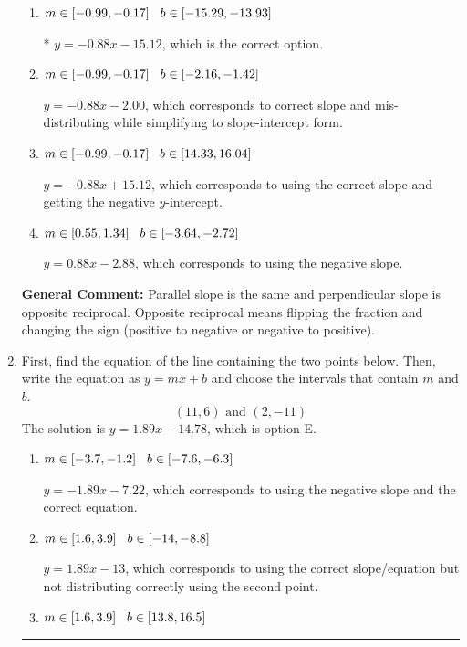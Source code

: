 \documentclass{extbook}[14pt]
\newcommand{\litem}[1]{\item #1

\rule{\textwidth}{0.4pt}}
\begin{document}
\begin{enumerate}
{\begin{enumerate}[label=\Alph*.]
 $y = -1.14x - 15.12$, which corresponds to using the reciprocal slope $(1/m)$.
\item \( m \in [-0.99, -0.17] \hspace*{3mm} b \in [-15.29, -13.93] \)

* $y = -0.88x - 15.12$, which is the correct option.
\item \( m \in [-0.99, -0.17] \hspace*{3mm} b \in [-2.16, -1.42] \)

 $y = -0.88x - 2.00$, which corresponds to correct slope and mis-distributing while simplifying to slope-intercept form.
\item \( m \in [-0.99, -0.17] \hspace*{3mm} b \in [14.33, 16.04] \)

 $y = -0.88x + 15.12$, which corresponds to using the correct slope and getting the negative $y$-intercept.
\item \( m \in [0.55, 1.34] \hspace*{3mm} b \in [-3.64, -2.72] \)

 $y = 0.88x - 2.88$, which corresponds to using the negative slope.
\end{enumerate}

\textbf{General Comment:} Parallel slope is the same and perpendicular slope is opposite reciprocal. Opposite reciprocal means flipping the fraction and changing the sign (positive to negative or negative to positive).
}
\litem{
First, find the equation of the line containing the two points below. Then, write the equation as $ y=mx+b $ and choose the intervals that contain $m$ and $b$.
\[ (11, 6) \text{ and } (2, -11) \]The solution is \( y = 1.89x -14.78 \), which is option E.\begin{enumerate}[label=\Alph*.]
\item \( m \in [-3.7, -1.2] \hspace*{3mm} b \in [-7.6, -6.3] \)

 $y = -1.89x -7.22$, which corresponds to using the negative slope and the correct equation.
\item \( m \in [1.6, 3.9] \hspace*{3mm} b \in [-14, -8.8] \)

 $y = 1.89x -13$, which corresponds to using the correct slope/equation but not distributing correctly using the second point.
\item \( m \in [1.6, 3.9] \hspace*{3mm} b \in [13.8, 16.5] \)


\end{enumerate}}
\end{enumerate}
\end{document}
